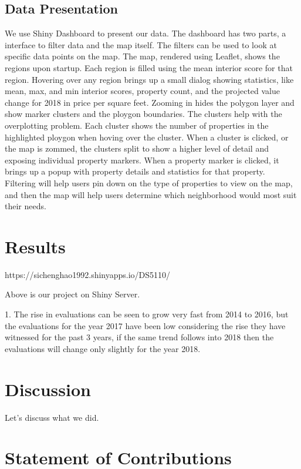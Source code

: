 \documentclass[12pt]{article}
\begin{document}
\subsection{Data Presentation}
We use Shiny Dashboard to present our data. The dashboard has two parts, 
a interface to filter data and the map itself. The filters can be used to
look at specific data points on the map. 
The map, rendered using Leaflet, shows the regions upon startup. Each region
is filled using the mean interior score for that region. Hovering over any
region brings up a small dialog showing statistics, like mean, max, and min
interior scores, property count, and the projected value change for 2018 in 
price per square feet. Zooming in hides the polygon layer and show marker 
clusters and the ploygon boundaries. The clusters help with the overplotting
problem. Each cluster shows the number of properties in the highlighted ploygon
when hoving over the cluster. When a cluster is clicked, or the map is zommed,
the clusters split to show a higher level of detail and exposing individual
property markers. When a property marker is clicked, it brings up a
popup with property details and statistics for that property. \\
Filtering will help users pin down on the type of properties to view on the 
map, and then the map will help users determine which neighborhood would 
most suit their needs.

\section*{Results}

https://sichenghao1992.shinyapps.io/DS5110/

Above is our project on Shiny Server. 


1. The rise in evaluations can be seen to grow very fast from 2014 to 2016, but the 
evaluations for the year 2017 have been low considering the rise they have witnessed 
for the past 3 years, if the same trend follows into 2018 then the evaluations will change 
only slightly for the year 2018.

\section*{Discussion}

Let's discuss what we did.

\section*{Statement of Contributions}
\end{document}
